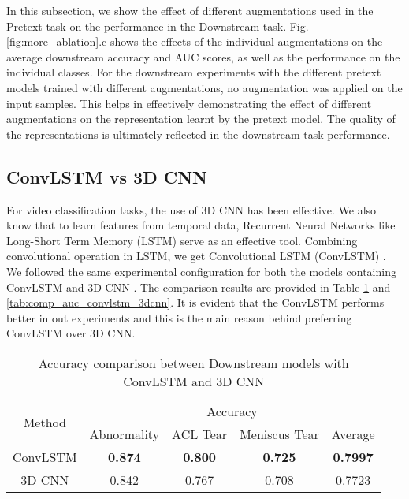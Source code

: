 \documentclass[journal]{IEEEtai}
\begin{document}
In this subsection, we show the effect of different augmentations used in the Pretext task on the performance in the Downstream task. Fig. \ref{fig:more_ablation}.c shows the effects of the individual augmentations on the average downstream accuracy and AUC scores, as well as the performance on the individual classes. For the downstream experiments with the different pretext models trained with different augmentations, no augmentation was applied on the input samples. This helps in effectively demonstrating the effect of different augmentations on the representation learnt by the pretext model. The quality of the representations is ultimately reflected in the downstream task performance.

\subsection{ConvLSTM vs 3D CNN}
\label{subsec:convlstmvs3dcnn}

For video classification tasks, the use of 3D CNN has been effective. We also know that to learn features from temporal data, Recurrent Neural Networks like Long-Short Term Memory (LSTM) serve as an effective tool. Combining convolutional operation in LSTM, we get Convolutional LSTM (ConvLSTM) \cite{convlstm}. We followed the same experimental configuration for both the models containing ConvLSTM and 3D-CNN \cite{3dcnn}. The comparison results are provided in Table \ref{tab:comp_acc_convlstm_3dcnn} and \ref{tab:comp_auc_convlstm_3dcnn}. It is evident that the ConvLSTM performs better in out experiments and this is the main reason behind preferring ConvLSTM over 3D CNN.

\begin{table}[!h]
    \centering
    \bgroup
    \caption{Accuracy comparison between Downstream models with ConvLSTM and 3D CNN}
    \def\arraystretch{1.8}
    \begin{tabular}{c|c|c|c|c}
    \hline
        \multirow{2}{1.2cm}{\centering Method} & \multicolumn{4}{c}{\centering Accuracy}\\ \cline{2-5}
        {} & Abnormality & ACL Tear & Meniscus Tear & Average\\  
        \hline \hline
ConvLSTM & \textbf{0.874} & \textbf{0.800} & \textbf{0.725} & \textbf{0.7997}\\ \hline
        3D CNN & 0.842 & 0.767 & 0.708 & 0.7723\\ \hline
         
    \end{tabular}
    \label{tab:comp_acc_convlstm_3dcnn}
    \egroup
\end{table}
\end{document}

